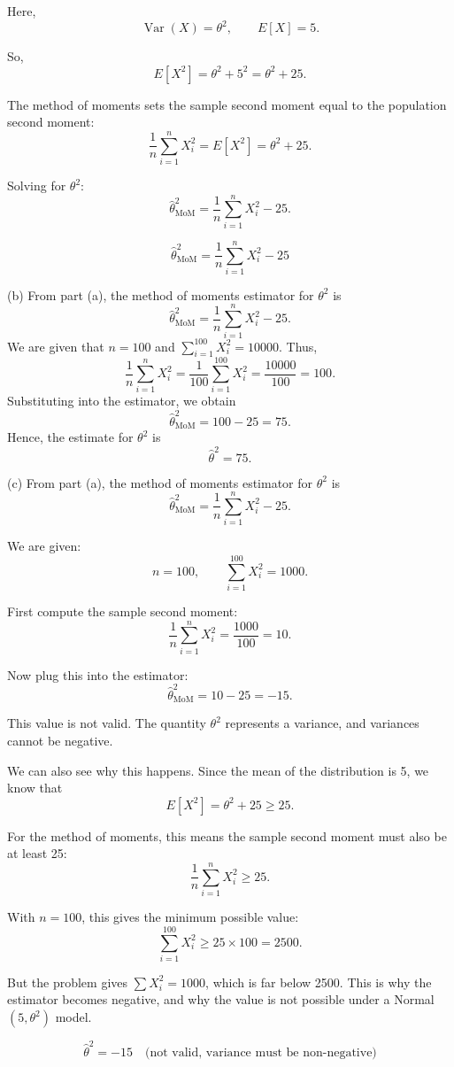 \documentclass[11pt,letterpaper]{article}
\theoremstyle{remark}
\begin{document}
Here,
\[
\operatorname{Var}(X) = \theta^2, \qquad E[X] = 5.
\]

So,
\[
E[X^2] = \theta^2 + 5^2 = \theta^2 + 25.
\]

The method of moments sets the sample second moment equal to the population second moment:
\[
\frac{1}{n}\sum_{i=1}^n X_i^2 = E[X^2] = \theta^2 + 25.
\]

Solving for $\theta^2$:
\[
\hat{\theta}^2_{\text{MoM}} = \frac{1}{n}\sum_{i=1}^n X_i^2 - 25.
\]

\[
\boxed{\hat{\theta}^2_{\text{MoM}} = \dfrac{1}{n}\sum_{i=1}^n X_i^2 - 25}
\]

(b) From part (a), the method of moments estimator for $\theta^2$ is
\[
\hat{\theta}^2_{\text{MoM}} = \frac{1}{n}\sum_{i=1}^n X_i^2 - 25.
\]
We are given that $n = 100$ and $\sum_{i=1}^{100} X_i^2 = 10000$. Thus,
\[
\frac{1}{n}\sum_{i=1}^n X_i^2
= \frac{1}{100}\sum_{i=1}^{100} X_i^2
= \frac{10000}{100}
= 100.
\]
Substituting into the estimator, we obtain
\[
\hat{\theta}^2_{\text{MoM}} = 100 - 25 = 75.
\]
Hence, the estimate for $\theta^2$ is
\[
\boxed{\hat{\theta}^2 = 75}.
\]

(c) From part (a), the method of moments estimator for $\theta^2$ is
\[
\hat{\theta}^2_{\text{MoM}} = \frac{1}{n}\sum_{i=1}^n X_i^2 - 25.
\]

We are given:
\[
n = 100, \qquad \sum_{i=1}^{100} X_i^2 = 1000.
\]

First compute the sample second moment:
\[
\frac{1}{n}\sum_{i=1}^n X_i^2
= \frac{1000}{100}
= 10.
\]

Now plug this into the estimator:
\[
\hat{\theta}^2_{\text{MoM}} = 10 - 25 = -15.
\]

This value is not valid. The quantity $\theta^2$ represents a variance, and variances cannot be negative.

We can also see why this happens. Since the mean of the distribution is 5, we know that
\[
E[X^2] = \theta^2 + 25 \ge 25.
\]

For the method of moments, this means the sample second moment must also be at least 25:
\[
\frac{1}{n}\sum_{i=1}^n X_i^2 \ge 25.
\]

With $n = 100$, this gives the minimum possible value:
\[
\sum_{i=1}^{100} X_i^2 \ge 25 \times 100 = 2500.
\]

But the problem gives $\sum X_i^2 = 1000$, which is far below 2500. This is why the estimator becomes negative, and why the value is not possible under a Normal$(5,\theta^2)$ model.

\[
\boxed{\hat{\theta}^2 = -15 \quad \text{(not valid, variance must be non-negative)}}
\]
\end{document}
